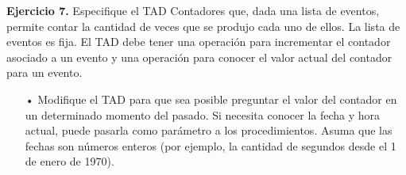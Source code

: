\documentclass{article}
\begin{document}
\textbf{Ejercicio 7.} Especifique el TAD Contadores que, dada una lista de eventos, permite contar la cantidad de veces que se
produjo cada uno de ellos. La lista de eventos es fija. El TAD debe tener una operaci\'on para incrementar el contador asociado
a un evento y una operaci\'on para conocer el valor actual del contador para un evento.
\begin{itemize}
    \item[•] Modifique el TAD para que sea posible preguntar el valor del contador en un determinado momento del pasado. Si necesita conocer la fecha y hora actual, puede pasarla como par\'ametro a los procedimientos. Asuma que las fechas son n\'umeros enteros (por ejemplo, la cantidad de segundos desde el 1 de enero de 1970).
\end{itemize}
\end{document}
